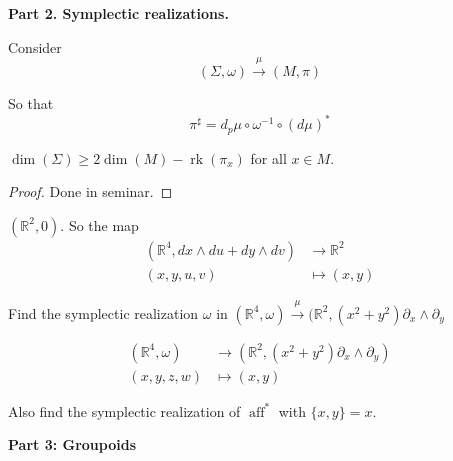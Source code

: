 \medskip\noindent
{\bf Part 2. Symplectic realizations.}

Consider
\[(\Sigma,\omega) \xrightarrow{\mu}(M,\pi)\]


\iffalse\begin{tikzcd}
	T_p\Sigma \arrow[r,"d_p\mu"]\arrow[d,"\omega^\flat"]&T_xM\\
	T_p^*\Sigma &  T^*_pM\arrow[l,"(d\mu)^*",swap]\arrow[u,"\pi ^\sharp"]
\end{tikzcd}\]\fi
So that 
\[\pi ^\sharp=d_p\mu \circ \omega^{-1} \circ(d\mu)^*\]



\begin{lemma}
\(\dim (\Sigma) \geq  2 \dim (M) - \operatorname{rk}(\pi_x)\) for all \(x \in M\).
\end{lemma}

\begin{proof}
Done in seminar.
\end{proof}

\begin{example}
\((\mathbb{R}^2,0)\). So the map
\begin{align*}
	(\mathbb{R}^4,dx \wedge du + dy \wedge dv) &\longrightarrow  \mathbb{R}^2\\
	(x,y,u,v) &\longmapsto (x,y)
\end{align*}

\end{example}

\begin{exercise}
Find the symplectic realization \(\omega\) in \((\mathbb{R}^4, \omega ) \xrightarrow{\mu}(\mathbb{R}^2,(x^2+y^2)\partial_x \wedge \partial_y\)

\begin{align*}
	(\mathbb{R}^4, \omega) &\longrightarrow (\mathbb{R}^2,(x^2+y^2) \partial_x \wedge \partial _y) \\
	(x,y,z,w) &\longmapsto (x,y)
\end{align*}

Also find the symplectic realization of \(\operatorname{ a f f }^*\) with \(\{x,y\}=x\).
\end{exercise}

\medskip\noindent
{\bf Part 3: Groupoids}

